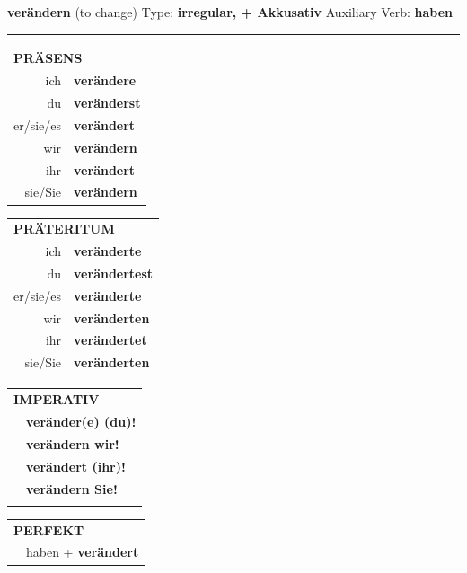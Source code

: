\documentclass[10pt,a4paper]{revtex4-2}
\begin{document}
\begin{verbbox-acc}
    {\Large \bf verändern} (to change) \hfill Type: \textbf{irregular, + Akkusativ} \hfill Auxiliary Verb: \textbf{haben} 
    
     \vspace{5pt}

    \hrule
    
    \vspace{5pt}

  \begin{tabular}{rl}
     \multicolumn{2}{l}{\textbf{PRÄSENS} }\\
    ich & \textbf{verändere}\\
    du & \textbf{veränderst}\\
    er/sie/es & \textbf{verändert}\\
    wir & \textbf{verändern}\\
    ihr & \textbf{verändert}\\
    sie/Sie & \textbf{verändern}\\
  \end{tabular}
  \hfill
     \begin{tabular}{rl}
    \multicolumn{2}{l}{\textbf{PRÄTERITUM} }\\
    ich & \textbf{veränderte}\\
    du & \textbf{verändertest}\\
    er/sie/es & \textbf{veränderte}\\
    wir & \textbf{veränderten}\\
    ihr & \textbf{verändertet}\\
    sie/Sie & \textbf{veränderten}\\
  \end{tabular}
  \hfill
  \begin{tabular}{rl}
     \multicolumn{2}{l}{\textbf{IMPERATIV} }\\
   & \textbf{veränder(e) (du)!}\\
   & \textbf{verändern wir!}\\
   & \textbf{verändert (ihr)!}\\
   & \textbf{verändern Sie!}\\
   & \vspace{10pt}
  \end{tabular}

    \vspace{10pt}

 \begin{tabular}{rl}
     \multicolumn{2}{l}{\textbf{PERFEKT}}\\
  &  haben + \textbf{verändert}\\
  \end{tabular}
\hfill
   \begin{tabular}{rl}
   

\end{tabular}
\end{verbbox-acc}
\end{document}
